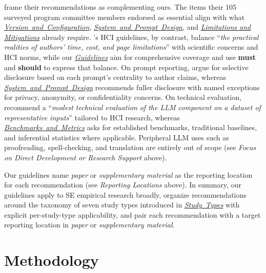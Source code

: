 \documentclass[smallextended]{svjour3}
\newcommand*{\enq}[1]{\enquote{{\itshape#1}}}
\newcommand{\must}{\textbf{must}\xspace}
\newcommand{\should}{\textbf{should}\xspace}
\newcommand{\paper}{\emph{paper}\xspace}
\newcommand{\supplementarymaterial}{\emph{supplementary material}\xspace}
\newcommand{\paper}{\emph{paper}\xspace}
\newcommand{\supplementarymaterial}{\emph{supplementary material}\xspace}
\newcommand{\studytypes}{\hyperref[sec:study-types]{\mbox{\emph{Study Types}}}\xspace}
\newcommand{\studytypes}{\href{/study-types/}{\emph{Study Types}}\xspace}
\newcommand{\guidelines}{\hyperref[sec:guidelines]{\mbox{\emph{Guidelines}}}\xspace}
\newcommand{\modelversion}{\hyperref[sec:report-model-version-configuration-and-customizations]{\mbox{\emph{Version and Configuration}}}\xspace}
\newcommand{\design}{\hyperref[sec:report-system-and-prompt-design]{\mbox{\emph{System and Prompt Design}}}\xspace}
\newcommand{\benchmarksmetrics}{\hyperref[sec:use-suitable-baselines-benchmarks-and-metrics]{\mbox{\emph{Benchmarks and Metrics}}}\xspace}
\newcommand{\limitationsmitigations}{\hyperref[sec:report-limitations-and-mitigations]{\emph{Limitations and Mitigations}}\xspace}
\newcommand{\guidelines}{\href{/guidelines/}{\emph{Guidelines}}\xspace}
\newcommand{\modelversion}{\href{/guidelines/model-version/}{\emph{Version and Configuration}}\xspace}
\newcommand{\design}{\href{/guidelines/design/}{\emph{System and Prompt Design}}\xspace}
\newcommand{\benchmarksmetrics}{\href{/guidelines/benchmarks-metrics/}{\emph{Benchmarks and Metrics}}\xspace}
\newcommand{\limitationsmitigations}{\href{/guidelines/limitations/}{\emph{Limitations and Mitigations}}\xspace}
\begin{document}
\citeauthor{DBLP:journals/corr/abs-2601-01954} frame their recommendations as complementing ours. The items their 105 surveyed program committee members endorsed as essential align with what \modelversion, \design, and \limitationsmitigations already require. \citeauthor{DBLP:conf/chi/NavarroSA26}'s HCI guidelines, by contrast, balance \enq{the practical realities of authors' time, cost, and page limitations} with scientific concerns and HCI norms, while our \guidelines aim for comprehensive coverage and use \must and \should to express that balance. On prompt reporting, \citeauthor{DBLP:conf/chi/NavarroSA26} argue for selective disclosure based on each prompt's centrality to author claims, whereas \design recommends fuller disclosure with named exceptions for privacy, anonymity, or confidentiality concerns. On technical evaluation, \citeauthor{DBLP:conf/chi/NavarroSA26} recommend a \enq{modest technical evaluation of the LLM component on a dataset of representative inputs} tailored to HCI research, whereas \benchmarksmetrics asks for established benchmarks, traditional baselines, and inferential statistics where applicable. Peripheral LLM uses such as proofreading, spell-checking, and translation are entirely out of scope (see \emph{Focus on Direct Development or Research Support} above).

Our guidelines name \paper or \supplementarymaterial as the reporting location for each recommendation (see \emph{Reporting Locations} above). In summary, our guidelines apply to SE empirical research broadly, organize recommendations around the taxonomy of seven study types introduced in \studytypes with explicit per-study-type applicability, and pair each recommendation with a target reporting location in \paper or \supplementarymaterial.

\section{Methodology}
\label{sec:methodology}
\end{document}
